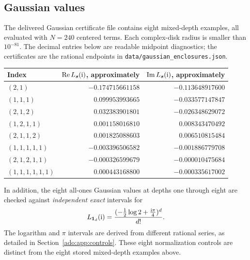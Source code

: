 \subsection{Gaussian values}
The delivered Gaussian certificate file contains eight mixed-depth
examples, all evaluated with $N=240$ centered terms. Each complex-disk
radius is smaller than $10^{-81}$. The decimal entries below are
readable midpoint diagnostics; the certificates are the rational
endpoints in \texttt{data/gaussian\_enclosures.json}.
\begin{center}\small
\begin{tabular}{@{}lrr@{}}
\toprule
Index & $\operatorname{Re} L_{\boldsymbol{s}}(\mathrm{i})$, approximately
      & $\operatorname{Im} L_{\boldsymbol{s}}(\mathrm{i})$, approximately\\
\midrule
$(2,1)$ & $-0.174715661158$ & $-0.113648917600$\\
$(1,1,1)$ & $0.099953993665$ & $-0.033577147847$\\
$(2,1,2)$ & $0.032383901801$ & $-0.026348629072$\\
$(1,2,1,1)$ & $0.001158016810$ & $0.008343470492$\\
$(2,1,1,2)$ & $0.001825088603$ & $0.006510815484$\\
$(1,1,1,1,1)$ & $-0.003396506582$ & $-0.001886779708$\\
$(2,1,2,1,1)$ & $-0.000326599679$ & $-0.000010475684$\\
$(1,1,1,1,1,1)$ & $0.000443168800$ & $-0.000335617002$\\
\bottomrule
\end{tabular}
\end{center}
In addition, the eight all-ones Gaussian values at depths one through
eight are checked against \emph{independent exact} intervals for
\[
 L_{\boldsymbol{1}_d}(\mathrm{i})=\frac{(-\tfrac12\log2+\tfrac{\mathrm{i}\pi}{4})^d}{d!}.
\]
The logarithm and $\pi$ intervals are derived from different rational
series, as detailed in Section~\ref{ado:app:controls}. These eight
normalization controls are distinct from the eight stored mixed-depth
examples above.

